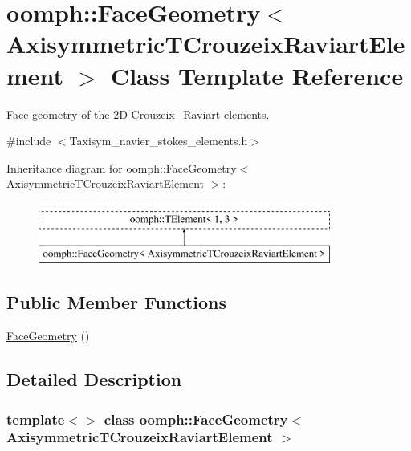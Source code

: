 \hypertarget{classoomph_1_1FaceGeometry_3_01AxisymmetricTCrouzeixRaviartElement_01_4}{}\section{oomph\+:\+:Face\+Geometry$<$ Axisymmetric\+T\+Crouzeix\+Raviart\+Element $>$ Class Template Reference}
\label{classoomph_1_1FaceGeometry_3_01AxisymmetricTCrouzeixRaviartElement_01_4}


Face geometry of the 2D Crouzeix\+\_\+\+Raviart elements.  




{\ttfamily \#include $<$Taxisym\+\_\+navier\+\_\+stokes\+\_\+elements.\+h$>$}

Inheritance diagram for oomph\+:\+:Face\+Geometry$<$ Axisymmetric\+T\+Crouzeix\+Raviart\+Element $>$\+:\begin{figure}[H]
\begin{center}
\leavevmode
\includegraphics[height=2.000000cm]{classoomph_1_1FaceGeometry_3_01AxisymmetricTCrouzeixRaviartElement_01_4}
\end{center}
\end{figure}
\subsection*{Public Member Functions}
\begin{DoxyCompactItemize}
\item 
\hyperlink{classoomph_1_1FaceGeometry_3_01AxisymmetricTCrouzeixRaviartElement_01_4_a3394e0d5a5eaad11fd762efb0cfcf4fe}{Face\+Geometry} ()
\end{DoxyCompactItemize}


\subsection{Detailed Description}
\subsubsection*{template$<$$>$\newline
class oomph\+::\+Face\+Geometry$<$ Axisymmetric\+T\+Crouzeix\+Raviart\+Element $>$}

